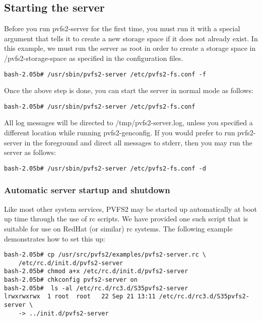 \documentclass[11pt, letterpaper]{article}
\begin{document}
\subsection{Starting the server}

Before you run pvfs2-server for the first time, you must run it with a special 
argument that tells it to create a new storage space if it does not already 
exist.  In this example, we must run the server as root in order to create
a storage space in /pvfs2-storage-space as specified in the configuration
files.

\begin{verbatim}
bash-2.05b# /usr/sbin/pvfs2-server /etc/pvfs2-fs.conf -f
\end{verbatim}

Once the above step is done, you can start the server in normal mode 
as follows:

\begin{verbatim}
bash-2.05b# /usr/sbin/pvfs2-server /etc/pvfs2-fs.conf
\end{verbatim}

All log messages will be directed to /tmp/pvfs2-server.log, unless you specified
a different location while running pvfs2-genconfig.  If you would prefer to run 
pvfs2-server in the foreground and direct all messages to stderr, then 
you may run the server as follows:

\begin{verbatim}
bash-2.05b# /usr/sbin/pvfs2-server /etc/pvfs2-fs.conf -d
\end{verbatim}

\subsubsection{Automatic server startup and shutdown}
\label{sec:rc}

Like most other system services, PVFS2 may be started up automatically
at boot up time through the use of rc scripts.  We have provided one
such script that is suitable for use on RedHat (or similar) rc
systems.  The following example demonstrates how to set this up:

\begin{verbatim}
bash-2.05b# cp /usr/src/pvfs2/examples/pvfs2-server.rc \
    /etc/rc.d/init.d/pvfs2-server
bash-2.05b# chmod a+x /etc/rc.d/init.d/pvfs2-server
bash-2.05b# chkconfig pvfs2-server on
bash-2.05b#  ls -al /etc/rc.d/rc3.d/S35pvfs2-server 
lrwxrwxrwx  1 root  root   22 Sep 21 13:11 /etc/rc.d/rc3.d/S35pvfs2-server \
    -> ../init.d/pvfs2-server
\end{verbatim}
\end{document}
